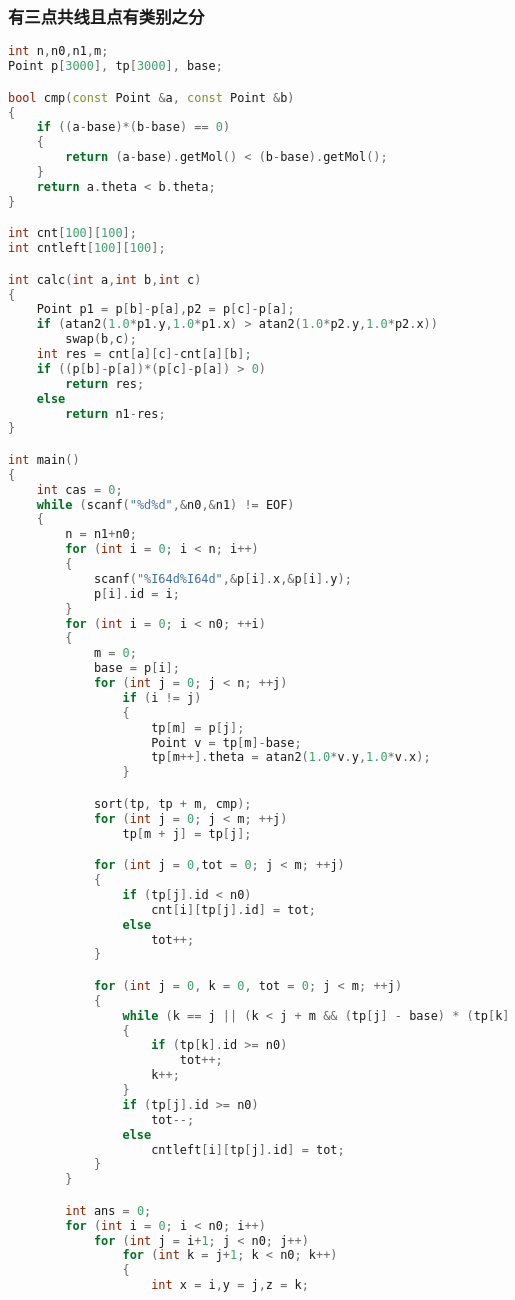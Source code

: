     \subsubsection{有三点共线且点有类别之分}
	\begin{lstlisting}[language=c++]
int n,n0,n1,m;
Point p[3000], tp[3000], base;

bool cmp(const Point &a, const Point &b)
{
    if ((a-base)*(b-base) == 0)
    {
        return (a-base).getMol() < (b-base).getMol();
    }
    return a.theta < b.theta;
}

int cnt[100][100];
int cntleft[100][100];

int calc(int a,int b,int c)
{
    Point p1 = p[b]-p[a],p2 = p[c]-p[a];
    if (atan2(1.0*p1.y,1.0*p1.x) > atan2(1.0*p2.y,1.0*p2.x))
        swap(b,c);
    int res = cnt[a][c]-cnt[a][b];
    if ((p[b]-p[a])*(p[c]-p[a]) > 0)
        return res;
    else
        return n1-res;
}

int main()
{
    int cas = 0;
    while (scanf("%d%d",&n0,&n1) != EOF)
    {
        n = n1+n0;
        for (int i = 0; i < n; i++)
        {
            scanf("%I64d%I64d",&p[i].x,&p[i].y);
            p[i].id = i;
        }
        for (int i = 0; i < n0; ++i)
        {
            m = 0;
            base = p[i];
            for (int j = 0; j < n; ++j)
                if (i != j)
                {
                    tp[m] = p[j];
                    Point v = tp[m]-base;
                    tp[m++].theta = atan2(1.0*v.y,1.0*v.x);
                }

            sort(tp, tp + m, cmp);
            for (int j = 0; j < m; ++j)
                tp[m + j] = tp[j];

            for (int j = 0,tot = 0; j < m; ++j)
            {
                if (tp[j].id < n0)
                    cnt[i][tp[j].id] = tot;
                else
                    tot++;
            }

            for (int j = 0, k = 0, tot = 0; j < m; ++j)
            {
                while (k == j || (k < j + m && (tp[j] - base) * (tp[k] - base) > 0))
                {
                    if (tp[k].id >= n0)
                        tot++;
                    k++;
                }
                if (tp[j].id >= n0)
                    tot--;
                else
                    cntleft[i][tp[j].id] = tot;
            }
        }

        int ans = 0;
        for (int i = 0; i < n0; i++)
            for (int j = i+1; j < n0; j++)
                for (int k = j+1; k < n0; k++)
                {
                    int x = i,y = j,z = k;


\end{lstlisting}
